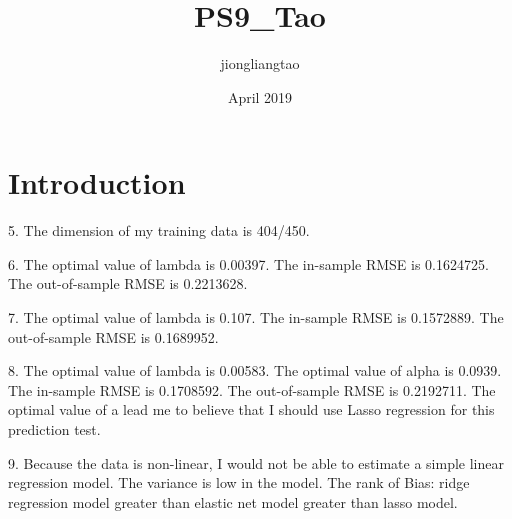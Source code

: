 \documentclass{article}
\title{PS9_Tao}
\author{jiongliangtao }
\date{April 2019}
\begin{document}
\maketitle

\section{Introduction}

5. The dimension of my training data is 404/450.

6. The optimal value of lambda is 0.00397. The in-sample RMSE is 0.1624725. The out-of-sample RMSE is 0.2213628.

7. The optimal value of lambda is 0.107. The in-sample RMSE is 0.1572889. The out-of-sample RMSE is  0.1689952.

8. The optimal value of lambda is 0.00583. The optimal value of alpha is 0.0939. The in-sample RMSE is 0.1708592. The out-of-sample RMSE is 0.2192711. The optimal value of a lead me to believe that I should use Lasso regression for this prediction test.

9. Because the data is non-linear, I would not be able to estimate a simple linear regression model. The variance is low in the model. The rank of Bias: ridge regression model greater than elastic net model greater than lasso model.
\end{document}
